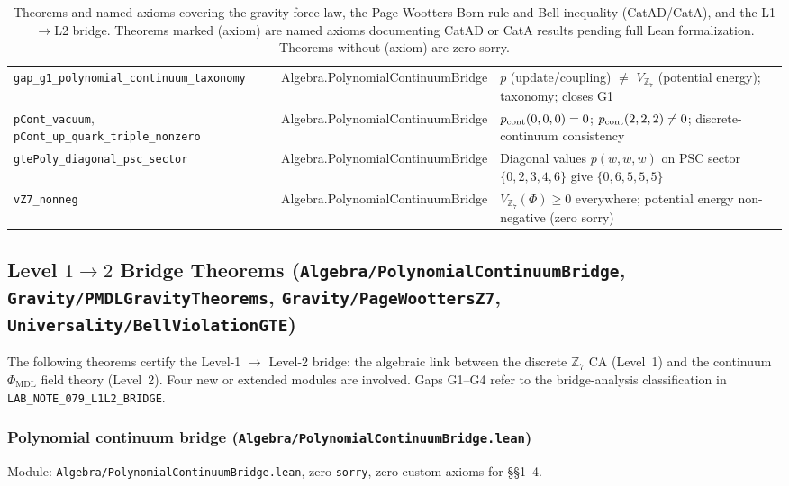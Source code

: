 \documentclass[11pt,a4paper]{article}
\theoremstyle{definition}
\newcommand{\ZS}{\mathbb{Z}_7}
\begin{document}
\begin{table}[h]
\begin{tabular}{@{}p{5.2cm}p{4.4cm}p{4.4cm}@{}}
\texttt{gap\_g1\_\allowbreak polynomial\_\allowbreak continuum\_\allowbreak taxonomy}
  & Algebra.\allowbreak PolynomialContinuumBridge
  & $p$ (update/coupling) $\neq$ $V_{\ZS}$ (potential energy); taxonomy; closes G1 \\[1pt]
\texttt{pCont\_vacuum}, \texttt{pCont\_up\_quark\_triple\_nonzero}
  & Algebra.\allowbreak PolynomialContinuumBridge
  & $p_{\rm cont}(0,0,0)=0$; $p_{\rm cont}(2,2,2)\neq 0$; discrete-continuum consistency \\[1pt]
\texttt{gtePoly\_diagonal\_psc\_sector}
  & Algebra.\allowbreak PolynomialContinuumBridge
  & Diagonal values $p(w,w,w)$ on PSC sector $\{0,2,3,4,6\}$ give $\{0,6,5,5,5\}$ \\[1pt]
\texttt{vZ7\_nonneg}
  & Algebra.\allowbreak PolynomialContinuumBridge
  & $V_{\ZS}(\Phi)\geq 0$ everywhere; potential energy non-negative (zero sorry) \\
\bottomrule
\end{tabular}
\caption{Theorems and named axioms covering the gravity force law, the
Page-Wootters Born rule and Bell inequality (CatAD/CatA), and the L1$\to$L2 bridge.
Theorems marked (axiom) are named axioms documenting CatAD or CatA results pending full
Lean formalization. Theorems without (axiom) are zero sorry.}
\label{tab:new-theorem-inventory-oq1-oq3}
\end{table}

\subsection{Level $1\to 2$ Bridge Theorems
  (\texttt{Algebra/PolynomialContinuumBridge},
   \texttt{Gravity/PMDLGravityTheorems},
   \texttt{Gravity/PageWoottersZ7},
   \texttt{Universality/BellViolationGTE})}\label{subsec:l1-l2-bridge}

The following theorems certify the Level-1 $\to$ Level-2 bridge: the
algebraic link between the discrete $\mathbb{Z}_7$ CA (Level~1) and
the continuum $\Phi_{\mathrm{MDL}}$ field theory (Level~2).
Four new or extended modules are involved.  Gaps G1--G4 refer to the
bridge-analysis classification in \texttt{LAB\_NOTE\_079\_L1L2\_BRIDGE}.

\subsubsection{Polynomial continuum bridge
  (\texttt{Algebra/PolynomialContinuumBridge.lean})}\label{subsubsec:poly-continuum-bridge}

Module: \texttt{Algebra/PolynomialContinuumBridge.lean}, zero \lstinline|sorry|,
zero custom axioms for \S\S 1--4.
\end{document}
